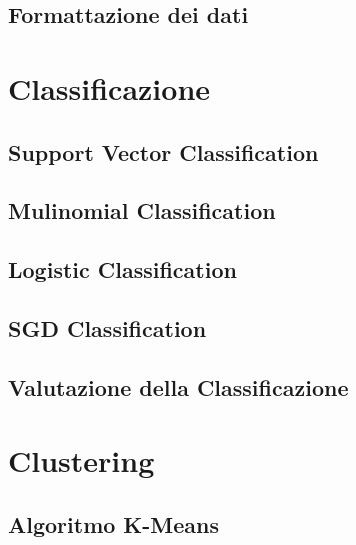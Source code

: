 \documentclass[12pt,oneside]{article}
\begin{document}
    \begin{enumerate}
    \subsection{Formattazione dei dati}
    \end{enumerate}


\section{Classificazione}
    \begin{enumerate}
    \subsection{Support Vector Classification}
    \end{enumerate}
   
    \begin{enumerate}
    \subsection{Mulinomial Classification}
    \end{enumerate}
    
    \begin{enumerate}
    \subsection{Logistic Classification}
    \end{enumerate}

    \begin{enumerate}
    \subsection{SGD Classification}
    \end{enumerate}
    
    \begin{enumerate}
    \subsection{Valutazione della Classificazione}
    \end{enumerate}


\section{Clustering}
    \begin{enumerate}
    \subsection{Algoritmo K-Means}
    \end{enumerate}
\end{document}
